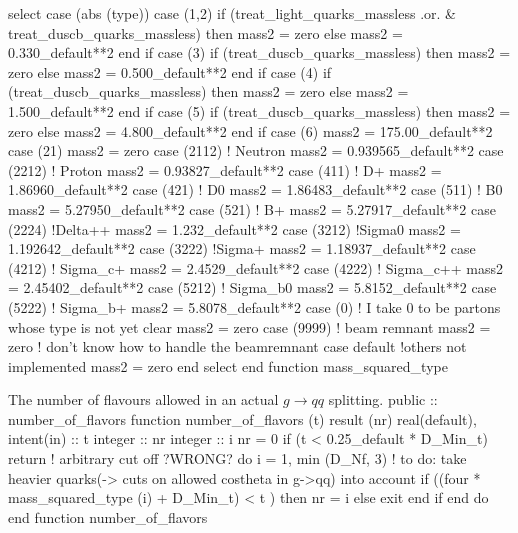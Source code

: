     select case (abs (type))
    case (1,2)
       if (treat_light_quarks_massless .or. &
            treat_duscb_quarks_massless) then
          mass2 = zero
       else
          mass2 = 0.330_default**2
       end if
    case (3)
       if (treat_duscb_quarks_massless) then
          mass2 = zero
       else
          mass2 = 0.500_default**2
       end if
    case (4)
       if (treat_duscb_quarks_massless) then
          mass2 = zero
       else
          mass2 = 1.500_default**2
       end if
    case (5)
       if (treat_duscb_quarks_massless) then
          mass2 = zero
       else
          mass2 = 4.800_default**2
       end if
    case (6)
       mass2 = 175.00_default**2
    case (21)
       mass2 = zero
    case (2112)   ! Neutron
       mass2 = 0.939565_default**2
    case (2212)   ! Proton
       mass2 = 0.93827_default**2
    case (411) ! D+
       mass2 = 1.86960_default**2
    case (421) ! D0
       mass2 = 1.86483_default**2
    case (511) ! B0
       mass2 = 5.27950_default**2
    case (521) ! B+
       mass2 = 5.27917_default**2
    case (2224) !Delta++
       mass2 = 1.232_default**2
    case (3212) !Sigma0
       mass2 = 1.192642_default**2
    case (3222) !Sigma+
       mass2 = 1.18937_default**2
    case (4212) ! Sigma_c+
       mass2 = 2.4529_default**2
    case (4222) ! Sigma_c++
       mass2 = 2.45402_default**2
    case (5212) ! Sigma_b0
       mass2 = 5.8152_default**2
    case (5222) ! Sigma_b+
       mass2 = 5.8078_default**2
    case (0) ! I take 0 to be partons whose type is not yet clear
       mass2 = zero
    case (9999) ! beam remnant
       mass2 = zero ! don't know how to handle the beamremnant
    case default !others not implemented
       mass2 = zero
    end select
  end function mass_squared_type

\eatline
\nwendcode{}The number of flavours allowed in an actual $g \to qq$ splitting.
\nwenddocs{}\plusendmoddef
  public :: number_of_flavors
\nwendcode{}\plusendmoddef
  function number_of_flavors (t) result (nr)
    real(default), intent(in) :: t
    integer :: nr
    integer :: i
    nr = 0
    if (t < 0.25_default * D_Min_t) return   ! arbitrary cut off ?WRONG?
    do i = 1, min (D_Nf, 3)
       ! to do: take heavier quarks(-> cuts on allowed costheta in g->qq) into account
       if ((four * mass_squared_type (i) + D_Min_t) < t ) then
          nr = i
       else
          exit
       end if
    end do
  end function number_of_flavors

